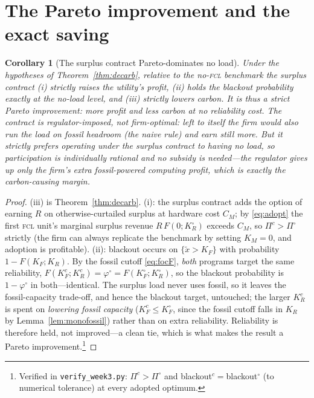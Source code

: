 \documentclass[11pt,reqno]{amsart}
\theoremstyle{plain}
\newtheorem{corollary}{Corollary}
\theoremstyle{definition}
\theoremstyle{remark}
\newcommand{\KR}{K_R}
\newcommand{\KF}{K_F}
\newcommand{\KM}{K_M}
\newcommand{\KRc}{K_R^{c}}
\newcommand{\KFc}{K_F^{c}}
\newcommand{\KRo}{K_R^{\circ}}
\newcommand{\KFo}{K_F^{\circ}}
\newcommand{\CM}{C_M}
\begin{document}
\section{The Pareto improvement and the exact saving}\label{sec:triplewin}

\begin{corollary}[The surplus contract Pareto-dominates no load]\label{cor:triplewin}
Under the hypotheses of Theorem~\ref{thm:decarb}, relative to the no-\textsc{fcl}
benchmark the surplus contract \textup{(i)} strictly raises the utility's profit,
\textup{(ii)} holds the blackout probability \emph{exactly} at the no-load level, and
\textup{(iii)} strictly lowers carbon. It is thus a strict Pareto
improvement: more profit and less carbon at no reliability cost. The contract is
regulator-imposed, not firm-optimal: left to itself the firm would also run the load on
fossil headroom (the naive rule) and earn still more. But it strictly prefers operating
under the surplus contract to having no load, so participation is individually rational
and no subsidy is needed---the regulator gives up only the firm's extra
\emph{fossil-powered} computing profit, which is exactly the carbon-causing margin.
\end{corollary}

\begin{proof}
(iii) is Theorem~\ref{thm:decarb}. (i): the surplus contract adds the option of
earning $R$ on otherwise-curtailed surplus at hardware cost $\CM$; by \eqref{eq:adopt}
the first \textsc{fcl} unit's marginal surplus revenue $R\,F(0;\KRo)$ exceeds $\CM$, so
$\Pi^{c}>\Pi^{\circ}$ strictly (the firm can always replicate the benchmark by setting
$\KM=0$, and adoption is profitable). (ii): blackout occurs on $\{\tilde x>\KF\}$ with
probability $1-F(\KF;\KR)$. By the fossil cutoff \eqref{eq:focF}, \emph{both} programs
target the same reliability, $F(\KFc;\KRc)=\varphi^{\circ}=F(\KFo;\KRo)$, so the
blackout probability is $1-\varphi^{\circ}$ in both---identical. The surplus load never
uses fossil, so it leaves the fossil-capacity trade-off, and hence the blackout target,
untouched; the larger $\KRc$ is spent on \emph{lowering fossil capacity}
($\KFc\le\KFo$, since the fossil cutoff falls in $\KR$ by Lemma~\ref{lem:monofossil})
rather than on extra reliability. Reliability is therefore held,
not improved---a clean tie, which is what makes the result a Pareto
improvement.\footnote{Verified in \texttt{verify\_week3.py}: $\Pi^{c}>\Pi^{\circ}$ and
blackout$^{c}=$blackout$^{\circ}$ (to numerical tolerance) at every adopted optimum.}
\end{proof}
\end{document}
